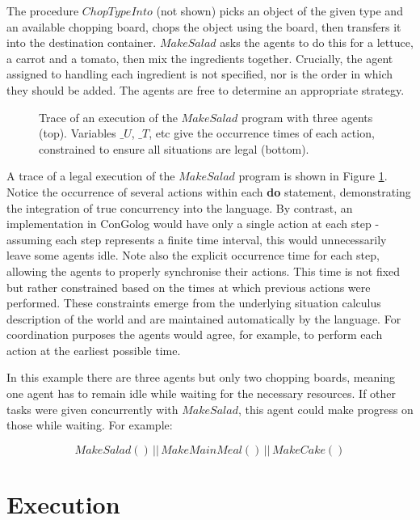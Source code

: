 \documentclass{llncs}
\begin{document}
The procedure $ChopTypeInto$ (not shown) picks an object of the given
type and an available chopping board, chops the object using the board,
then transfers it into the destination container. $MakeSalad$ asks
the agents to do this for a lettuce, a carrot and a tomato, then mix
the ingredients together. Crucially, the agent assigned to handling
each ingredient is not specified, nor is the order in which they should
be added. The agents are free to determine an appropriate strategy.

%
\begin{figure}[hbt]





\caption{\label{cap:example_trace}Trace of an execution of the $MakeSalad$
program with three agents (top). Variables $\_ U$, $\_ T$, etc give
the occurrence times of each action, constrained to ensure all situations
are legal (bottom).}
\end{figure}


A trace of a legal execution of the $MakeSalad$ program is shown
in Figure \ref{cap:example_trace}. Notice the occurrence of several
actions within each \textbf{do} statement, demonstrating the integration
of true concurrency into the language. By contrast, an implementation
in ConGolog would have only a single action at each step - assuming
each step represents a finite time interval, this would unnecessarily
leave some agents idle. Note also the explicit occurrence time for
each step, allowing the agents to properly synchronise their actions.
This time is not fixed but rather constrained based on the times at
which previous actions were performed. These constraints emerge from
the underlying situation calculus description of the world and are
maintained automatically by the language. For coordination purposes
the agents would agree, for example, to perform each action at the
earliest possible time.

In this example there are three agents but only two chopping boards,
meaning one agent has to remain idle while waiting for the necessary
resources. If other tasks were given concurrently with $MakeSalad$,
this agent could make progress on those while waiting. For example:

\[
MakeSalad()\,||\, MakeMainMeal()\,||\, MakeCake()\]





\section{Execution}
\end{document}
